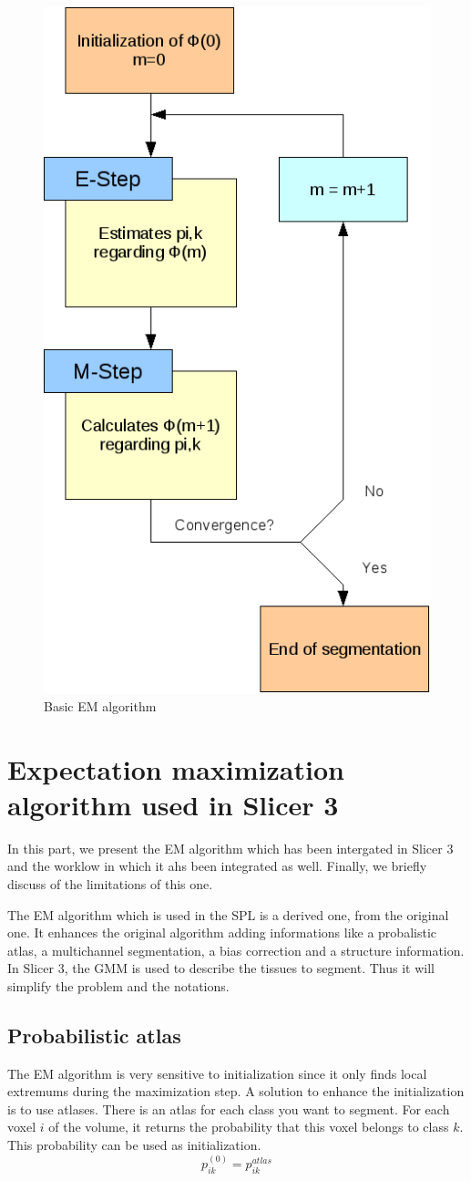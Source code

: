   \begin{figure}[ht]\centering
  \includegraphics[width=.6\textwidth]{Images/Graphics/EMSimple.png}
  \caption{Basic EM algorithm}\label{fig:EMAlgorithm}
  \end{figure}

\section{Expectation maximization algorithm used in Slicer 3}\label{angels}
In this part, we present the EM algorithm which has been intergated in Slicer 3 and the worklow in which it ahs been integrated as well. Finally, we briefly discuss of the limitations of this one.
\par
The EM algorithm which is used in the SPL is a derived one, from the original one. It enhances the original algorithm adding informations like a probalistic atlas, a multichannel segmentation, a bias correction and a structure information. In Slicer 3, the GMM is used to describe the tissues to segment. Thus it will simplify the problem and the notations.
%
\subsection{Probabilistic atlas}\label{spatial}
The EM algorithm is very sensitive to initialization since it only finds local extremums during the maximization step. A solution to enhance the initialization is to use atlases. There is an atlas for each class you want to segment. For each voxel $i$ of the volume, it returns the probability that this voxel belongs to class $k$. This probability can be used as initialization.
  \begin{equation*}
  p_{ik}^{(0)} = p_{ik}^{atlas}
  \end{equation*}   

